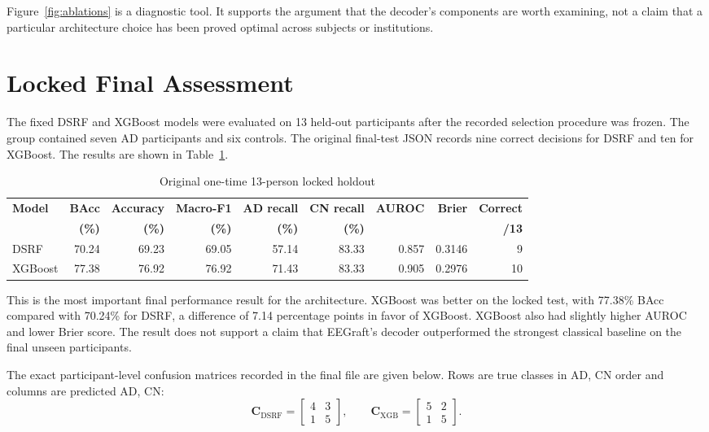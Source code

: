 
Figure~\ref{fig:ablations} is a diagnostic tool. It supports the argument that the decoder's components are worth examining, not a claim that a particular architecture choice has been proved optimal across subjects or institutions.

\section{Locked Final Assessment}
The fixed DSRF and XGBoost models were evaluated on 13 held-out participants after the recorded selection procedure was frozen. The group contained seven AD participants and six controls. The original final-test JSON records nine correct decisions for DSRF and ten for XGBoost. The results are shown in Table~\ref{tab:holdout}.

\begin{table}[htbp]\centering\scriptsize
\caption{Original one-time 13-person locked holdout}\label{tab:holdout}
\begin{tabular}{@{}lrrrrrrrr@{}}\toprule
\textbf{Model}&\textbf{BAcc}&\textbf{Accuracy}&\textbf{Macro-F1}&\textbf{AD recall}&\textbf{CN recall}&\textbf{AUROC}&\textbf{Brier}&\textbf{Correct}\\
&\textbf{(\%)}&\textbf{(\%)}&\textbf{(\%)}&\textbf{(\%)}&\textbf{(\%)}&&&\textbf{/13}\\\midrule
DSRF&70.24&69.23&69.05&57.14&83.33&0.857&0.3146&9\\
XGBoost&77.38&76.92&76.92&71.43&83.33&0.905&0.2976&10\\\bottomrule
\end{tabular}\end{table}

This is the most important final performance result for the architecture. XGBoost was better on the locked test, with 77.38\% BAcc compared with 70.24\% for DSRF, a difference of 7.14 percentage points in favor of XGBoost. XGBoost also had slightly higher AUROC and lower Brier score. The result does not support a claim that EEGraft's decoder outperformed the strongest classical baseline on the final unseen participants.

The exact participant-level confusion matrices recorded in the final file are given below. Rows are true classes in AD, CN order and columns are predicted AD, CN:
\begin{equation}
\mathbf C_{\mathrm{DSRF}}=\begin{bmatrix}4&3\\1&5\end{bmatrix},\qquad
\mathbf C_{\mathrm{XGB}}=\begin{bmatrix}5&2\\1&5\end{bmatrix}.
\label{eq:confusion}
\end{equation}

